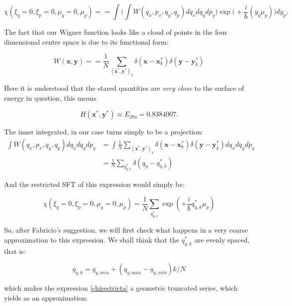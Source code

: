 \documentclass[a4paper,12pt]{article}
\newcommand{\ihb}{\frac{i}{\hbar}}
\newcommand{\xfase}{\mathbf{x}}
\newcommand{\yfase}{\mathbf{y}}
\begin{document}
\begin{equation}
\chi(\xi_q=0, \xi_p=0, \mu_q=0, \mu_p)  = 
  =  \int   \Biggl( \int W(q_x, p_x, q_y, q_p) dq_x dq_y dp_y \Biggr) 
\exp  \bigl(+\ihb (y_q \mu_p ) \bigr) d y_p.
\end{equation}

The fact that our Wigner function looks like a cloud
of points in the four dimensional centre space is due 
to its functional form:

\begin{equation}
W(\xfase, \yfase)= 
=\frac{1}{N}\sum_{(\xfase^*, \yfase^*)_k} \delta (\xfase - \xfase_k^*)
\delta (\yfase - \yfase_k^*)
\end{equation}

Here it is understood that the stared quantities are
\emph{very close} to the surface of energy in question,
this means

\begin{equation}
H(\xfase^*, \yfase^*)  \approx E_{294} = 0.8384007.
\end{equation}


The inner integrated, in our case turns simply to be a projection:
\begin{align}
\int W(q_x, p_x, q_y, q_p) dq_x dq_y dp_y & =
\int 
\frac{1}{N}\sum_{(\xfase^*, \yfase^*)_k}
\delta (\xfase - \xfase_k^*)\delta (\yfase - \yfase_k^*) 
dq_x dq_y dp_y \\
& = \frac{1}{N}\sum_{q_{y,k}^*} 
 \delta(q_y - q_{y,k}^*) 
\end{align}

And the restricted SFT of this expression would simply be:

\begin{equation}\label{chirestricta}
\chi(\xi_q=0, \xi_p=0, \mu_q=0, \mu_p)  = 
\frac{1}{N}\sum_{q_{y,k}^*} \exp(+\ihb q_{y,k}^* \mu_p)
\end{equation}

So, after Fabricio's suggestion, we will first check what
happens in a very coarse approximation to this expression.
We shall think that the $q_{y,k}^*$ are evenly spaced, that is:

\begin{equation}\label{evenlyspaced}
q_{y,k}=q_{y,min}+(q_{y,max}-q_{y,min})k/N
\end{equation}

which makes the expression \ref{chirestricta} a geometric
truncated series, which yields as an approximation:
\end{document}

